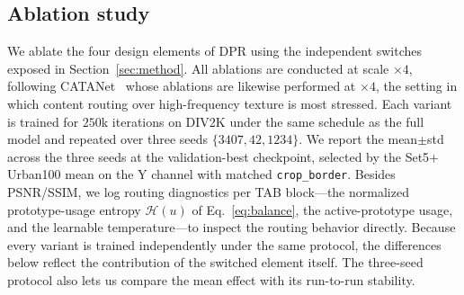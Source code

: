 \subsection{Ablation study}
\label{sec:ablation}

We ablate the four design elements of DPR using the independent switches exposed in
Section~\ref{sec:method}. All ablations are conducted at scale $\times4$, following
CATANet~\cite{liu2025catanet} whose ablations are likewise performed at $\times4$, the
setting in which content routing over high-frequency texture is most stressed. Each
variant is trained for $250$k iterations on DIV2K under the same schedule as the full
model and repeated over three seeds $\{3407,42,1234\}$. We report the mean$\pm$std
across the three seeds at the validation-best checkpoint, selected by the
Set5$+$Urban100 mean on the Y channel with matched \texttt{crop\_border}. Besides
PSNR/SSIM, we log routing diagnostics per TAB block---the normalized prototype-usage
entropy $\mathcal{H}(u)$ of Eq.~\eqref{eq:balance}, the active-prototype usage, and
the learnable temperature---to inspect the routing behavior directly. Because every
variant is trained independently under the same protocol, the differences below
reflect the contribution of the switched element itself. The three-seed protocol also
lets us compare the mean effect with its run-to-run stability.

